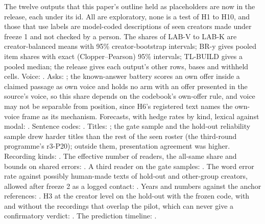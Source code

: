 The twelve outputs that this paper's outline held as placeholders are now in the release, each under its id. All are
exploratory, none is a test of H1 to H10, and those that use labels are model-coded descriptions of seen creators made
under freeze 1 and not checked by a person. The shares of LAB-V to LAB-K are creator-balanced means with 95\%
creator-bootstrap intervals; BR-y gives pooled item shares with exact (Clopper--Pearson) 95\% intervals; TL-BUILD gives
a pooled median; the release gives each output's other rows, bases and withheld cells. Voice: \PendLabV.
Asks: \PendLabA; the known-answer battery scores an own offer inside a claimed passage as own voice and holds no arm with an offer presented in the source's voice, so this share depends on the codebook's own-offer rule, and voice may not be
separable from position, since H6's registered text names the own-voice frame as its mechanism. Forecasts, with hedge rates by kind, lexical against modal: \PendLabF. Sentence codes: \PendLabS.
Titles: \PendLabT; the gate sample and the hold-out reliability sample drew harder titles than the rest of the seen roster (the third-round programme's r3-P20); outside them, presentation agreement was higher. Recording kinds: \PendLabK. The effective number of readers, the all-same share and bounds on
shared errors: \PendVerDep. A third reader on the gate samples: \PendVerAdjG. The word error rate against possibly
human-made texts of hold-out and other-group creators, allowed after freeze 2 as a logged contact: \PendBrbH. Years
and numbers against the anchor references: \PendBrY. H3 at the creator level on the hold-out with the frozen code, with
and without the recordings that overlap the pilot, which can never give a confirmatory verdict: \PendHThreeX. The
prediction timeline: \PendTlBuild.


